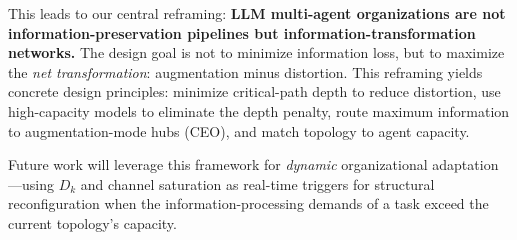 \documentclass[conference]{IEEEtran}
\begin{document}
This leads to our central reframing: \textbf{LLM multi-agent organizations are not information-preservation pipelines but information-transformation networks.}
The design goal is not to minimize information loss, but to maximize the \emph{net transformation}: augmentation minus distortion.
This reframing yields concrete design principles: minimize critical-path depth to reduce distortion, use high-capacity models to eliminate the depth penalty, route maximum information to augmentation-mode hubs (CEO), and match topology to agent capacity.

Future work will leverage this framework for \emph{dynamic} organizational adaptation---using $D_k$ and channel saturation as real-time triggers for structural reconfiguration when the information-processing demands of a task exceed the current topology's capacity.


\end{document}
